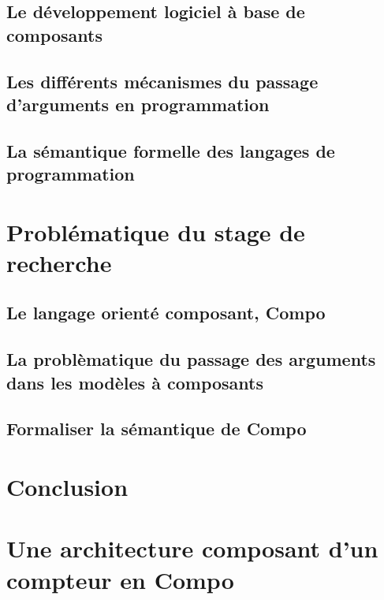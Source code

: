 \documentclass[utf8]{stageM2R} %
\begin{document}
  \section{Le développement logiciel à base de composants}
  
    

  \section{Les différents mécanismes du passage d'arguments en programmation}

    
  
  \section{La sémantique formelle des langages de programmation}
  
    
        
\chapter{Problématique du stage de recherche} 

  \section{Le langage orienté composant, Compo} 
  
    
    
  \section{La problèmatique du passage des arguments dans les modèles à composants}
    
    
    
  \section{Formaliser la sémantique de Compo}
    
    
    
\chapter{Conclusion} 

  
  
\appendix 
  \clearpage
	
  \chapter{Une architecture composant d'un compteur en Compo}
    
    \label{ann:compoexemple}
  
    
  

 
  
\end{document}
